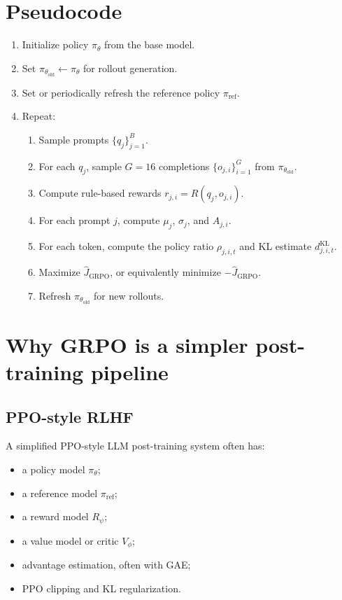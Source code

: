\documentclass[11pt]{article}
\newcommand{\old}{\mathrm{old}}
\newcommand{\refm}{\mathrm{ref}}
\newcommand{\GRPO}{\mathrm{GRPO}}
\begin{document}
\section{Pseudocode}

\begin{enumerate}[leftmargin=*]
  \item Initialize policy $\pi_\theta$ from the base model.
  \item Set $\pi_{\theta_{\old}}\leftarrow \pi_\theta$ for rollout generation.
  \item Set or periodically refresh the reference policy $\pi_{\refm}$.
  \item Repeat:
  \begin{enumerate}[leftmargin=*]
    \item Sample prompts $\{q_j\}_{j=1}^{B}$.
    \item For each $q_j$, sample $G=16$ completions $\{o_{j,i}\}_{i=1}^{G}$ from $\pi_{\theta_{\old}}$.
    \item Compute rule-based rewards $r_{j,i}=R(q_j,o_{j,i})$.
    \item For each prompt $j$, compute $\mu_j$, $\sigma_j$, and $A_{j,i}$.
    \item For each token, compute the policy ratio $\rho_{j,i,t}$ and KL estimate $d^{\mathrm{KL}}_{j,i,t}$.
    \item Maximize $\widehat{J}_{\GRPO}$, or equivalently minimize $-\widehat{J}_{\GRPO}$.
    \item Refresh $\pi_{\theta_{\old}}$ for new rollouts.
  \end{enumerate}
\end{enumerate}

\section{Why GRPO is a simpler post-training pipeline}

\subsection{PPO-style RLHF}

A simplified PPO-style LLM post-training system often has:
\begin{itemize}[leftmargin=*]
  \item a policy model $\pi_\theta$;
  \item a reference model $\pi_{\refm}$;
  \item a reward model $R_\psi$;
  \item a value model or critic $V_\phi$;
  \item advantage estimation, often with GAE;
  \item PPO clipping and KL regularization.
\end{itemize}
\end{document}
